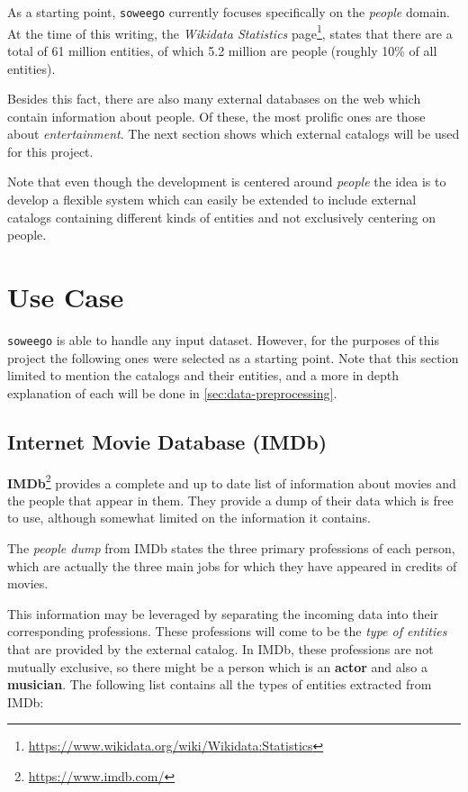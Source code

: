 \documentclass[epsfig,a4paper,11pt,titlepage,twoside,openany]{book}
\newcommand{\footurl}[1]{\footnote{\url{#1}}}
\begin{document}
As a starting point, \texttt{soweego} currently focuses specifically on the \textit{people} domain. At the time of this writing, the \textit{Wikidata Statistics} page\footurl{https://www.wikidata.org/wiki/Wikidata:Statistics}, states that there are a total of 61 million entities, of which 5.2 million are people (roughly 10\% of all entities). 


Besides this fact, there are also many external databases on the web which contain information about people. Of these, the most prolific ones are those about \textit{entertainment}. The next section shows which external catalogs will be used for this project. 


Note that even though the development is centered around \textit{people} the idea is to develop a flexible system which can easily be extended to include external catalogs containing different kinds of entities and not exclusively centering on people. 

\section{Use Case}
\label{sec:statement-use-case}

\texttt{soweego} is able to handle any input dataset. However, for the purposes of this project the following ones were selected as a starting point. Note that this section limited to mention the catalogs and their entities, and a more in depth explanation of each will be done in \autoref{sec:data-preprocessing}. 

\subsection{Internet Movie Database (IMDb)}
\label{sec:catalog-imdb}

\textbf{IMDb}\footurl{https://www.imdb.com/} provides a complete and up to date list of information about movies and the people that appear in them. They provide a dump of their data which is free to use, although somewhat limited on the information it contains.

The \textit{people dump} from IMDb states the three primary professions of each person, which are actually the three main jobs for which they have appeared in credits of movies. 


This information may be leveraged by separating the incoming data into their corresponding professions. These professions will come to be the \textit{type of entities} that are provided by the external catalog. In IMDb, these professions are not mutually exclusive, so there might be a person which is an \textbf{actor} and also a \textbf{musician}. The following list contains all the types of entities extracted from IMDb: 
\end{document}
